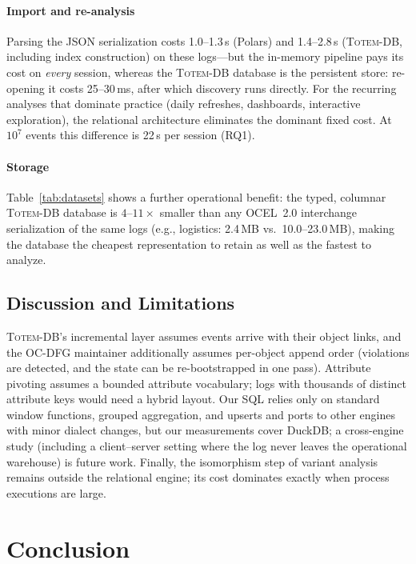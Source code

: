 \documentclass[sigconf, nonacm]{acmart}
\newcommand{\sys}{\textsc{Totem-DB}\xspace}
\newcommand{\ocel}{OCEL~2.0\xspace}
\begin{document}
\paragraph{Import and re-analysis}
Parsing the JSON serialization costs 1.0--1.3\,s (Polars) and 1.4--2.8\,s (\sys, including index construction) on these logs---but the in-memory pipeline pays its cost on \emph{every} session, whereas the \sys database is the persistent store: re-opening it costs 25--30\,ms, after which discovery runs directly. For the recurring analyses that dominate practice (daily refreshes, dashboards, interactive exploration), the relational architecture eliminates the dominant fixed cost. At $10^7$ events this difference is 22\,s per session (RQ1).

\paragraph{Storage}
Table~\ref{tab:datasets} shows a further operational benefit: the typed, columnar \sys database is $4$--$11\times$ smaller than any \ocel interchange serialization of the same logs (e.g., logistics: 2.4\,MB vs.\ 10.0--23.0\,MB), making the database the cheapest representation to retain as well as the fastest to analyze.

\subsection{Discussion and Limitations}
\label{sec:eval-discussion}

\sys's incremental layer assumes events arrive with their object links, and the OC-DFG maintainer additionally assumes per-object append order (violations are detected, and the state can be re-bootstrapped in one pass). Attribute pivoting assumes a bounded attribute vocabulary; logs with thousands of distinct attribute keys would need a hybrid layout. Our SQL relies only on standard window functions, grouped aggregation, and upserts and ports to other engines with minor dialect changes, but our measurements cover DuckDB; a cross-engine study (including a client--server setting where the log never leaves the operational warehouse) is future work. Finally, the isomorphism step of variant analysis remains outside the relational engine; its cost dominates exactly when process executions are large.

\section{Conclusion}
\label{sec:conclusion}
\end{document}
